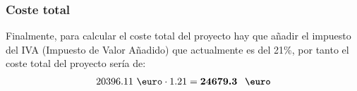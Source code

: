 \subsubsection{Coste total}
Finalmente, para calcular el coste total del proyecto hay que añadir el impuesto del IVA (Impuesto de Valor Añadido) que actualmente es del 21\%, por tanto el coste total del proyecto sería de:
\begin{eqnarray} 
20396.11 \mbox{ \euro} \cdot 1.21 = \textbf{24679.3 \mbox{ \euro}}
\end{eqnarray}